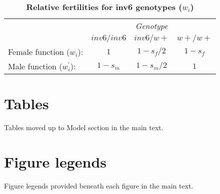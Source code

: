 \documentclass[11pt,draft]{article}
\begin{document}
\begin{table}[htbp]
 \centering
 \caption{\bf Relative fertilities for inv6 genotypes ($w_{i}$)}
\label{tab:inv6Fitness}
\begin{tabular}{lccc}
 \toprule
					&  \multicolumn{3}{c}{{\textit{Genotype}}} \\ 
\cline{2-4}
									& $inv6/inv6$	& $inv6/w+$		& $w+/w+$ 	\\ \hline
Female function ($w_{i}$):			& $1$			& $1 - s_f/2$	& $1 - s_f$ \\	
Male function ($w^{\prime}_{i}$):	& $1 - s_m$		& $1 - s_m/2$	& $1$ 		\\	
\hline
\end{tabular}
\end{table}




%
%
\newpage{}





\section{Tables}
\renewcommand{\thetable}{\arabic{table}}
\setcounter{table}{0}

Tables moved up to Model section in the main text.

\section{Figure legends}

Figure legends provided beneath each figure in the main text.

\end{document}
